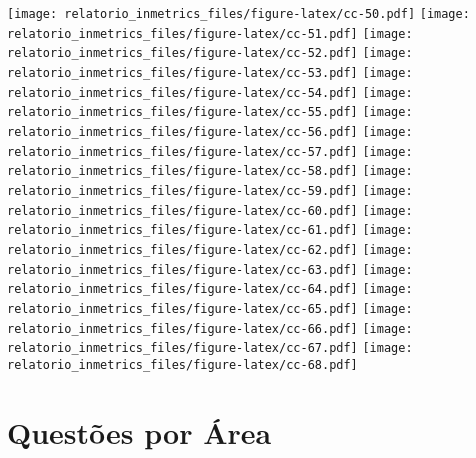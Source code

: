 \documentclass[]{book}
\begin{document}
\texttt{[image: relatorio\_inmetrics\_files/figure-latex/cc-50.pdf]} \texttt{[image: relatorio\_inmetrics\_files/figure-latex/cc-51.pdf]} \texttt{[image: relatorio\_inmetrics\_files/figure-latex/cc-52.pdf]} \texttt{[image: relatorio\_inmetrics\_files/figure-latex/cc-53.pdf]} \texttt{[image: relatorio\_inmetrics\_files/figure-latex/cc-54.pdf]} \texttt{[image: relatorio\_inmetrics\_files/figure-latex/cc-55.pdf]} \texttt{[image: relatorio\_inmetrics\_files/figure-latex/cc-56.pdf]} \texttt{[image: relatorio\_inmetrics\_files/figure-latex/cc-57.pdf]} \texttt{[image: relatorio\_inmetrics\_files/figure-latex/cc-58.pdf]} \texttt{[image: relatorio\_inmetrics\_files/figure-latex/cc-59.pdf]} \texttt{[image: relatorio\_inmetrics\_files/figure-latex/cc-60.pdf]} \texttt{[image: relatorio\_inmetrics\_files/figure-latex/cc-61.pdf]} \texttt{[image: relatorio\_inmetrics\_files/figure-latex/cc-62.pdf]} \texttt{[image: relatorio\_inmetrics\_files/figure-latex/cc-63.pdf]} \texttt{[image: relatorio\_inmetrics\_files/figure-latex/cc-64.pdf]} \texttt{[image: relatorio\_inmetrics\_files/figure-latex/cc-65.pdf]} \texttt{[image: relatorio\_inmetrics\_files/figure-latex/cc-66.pdf]} \texttt{[image: relatorio\_inmetrics\_files/figure-latex/cc-67.pdf]} \texttt{[image: relatorio\_inmetrics\_files/figure-latex/cc-68.pdf]}

\hypertarget{questoes-por-area}{%
\section{Questões por Área}\label{questoes-por-area}}
\end{document}
